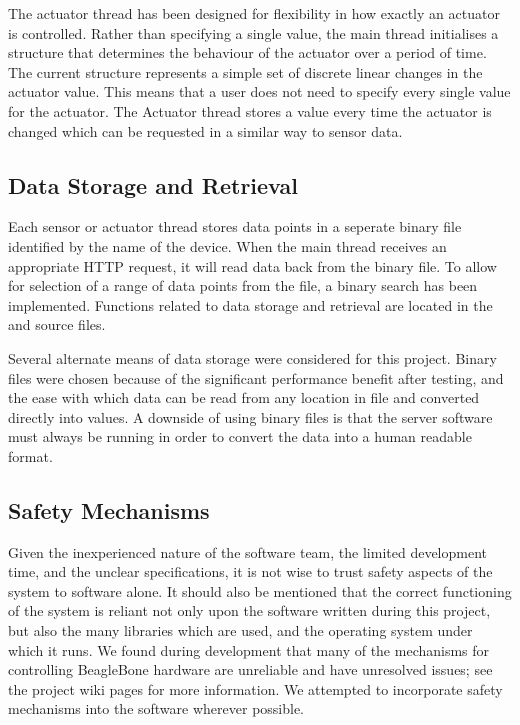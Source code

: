 The actuator thread has been designed for flexibility in how exactly an actuator is controlled. Rather than specifying a single value, the main thread initialises a structure that determines the behaviour of the actuator over a period of time. The current structure represents a simple set of discrete linear changes in the actuator value. This means that a user does not need to specify every single value for the actuator. The Actuator thread stores a value every time the actuator is changed which can be requested in a similar way to sensor data.



\subsection{Data Storage and Retrieval}

Each sensor or actuator thread stores data points in a seperate binary file identified by the name of the device. When the main thread receives an appropriate HTTP request, it will read data back from the binary file. To allow for selection of a range of data points from the file, a binary search has been implemented. Functions related to data storage and retrieval are located in the  and  source files.

Several alternate means of data storage were considered for this project. Binary files were chosen because of the significant performance benefit after testing, and the ease with which data can be read from any location in file and converted directly into values. A downside of using binary files is that the server software must always be running in order to convert the data into a human readable format.



\subsection{Safety Mechanisms}

Given the inexperienced nature of the software team, the limited development time, and the unclear specifications, it is not wise to trust safety aspects of the system to software alone. It should also be mentioned that the correct functioning of the system is reliant not only upon the software written during this project, but also the many libraries which are used, and the operating system under which it runs. We found during development that many of the mechanisms for controlling BeagleBone hardware are unreliable and have unresolved issues; see the project wiki pages\cite{mctx3420_wiki} for more information. We attempted to incorporate safety mechanisms into the software wherever possible.

